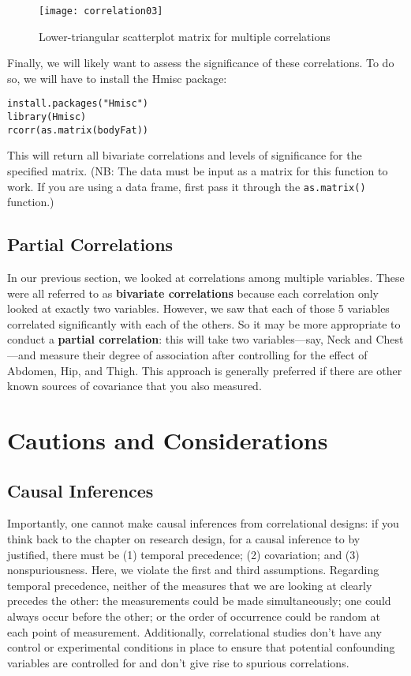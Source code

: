\begin{figure}[h]
\texttt{[image: correlation03]}
\label{fig:correlation03}
\caption{Lower-triangular scatterplot matrix for multiple correlations}
\end{figure}

Finally, we will likely want to assess the significance of these correlations. To do so, we will have to install the Hmisc package:

\begin{framed}
\begin{Verbatim}[samepage=TRUE]
install.packages("Hmisc")
library(Hmisc)
rcorr(as.matrix(bodyFat))
\end{Verbatim}
\end{framed}

This will return all bivariate correlations and levels of significance for the specified matrix. (NB: The data must be input as a matrix for this function to work. If you are using a data frame, first pass it through the \verb|as.matrix()| function.)

\subsection{Partial Correlations}
In our previous section, we looked at correlations among multiple variables. These were all referred to as \textbf{bivariate correlations} because each correlation only looked at exactly two variables. However, we saw that each of those 5 variables correlated significantly with each of the others. So it may be more appropriate to conduct a \textbf{partial correlation}: this will take two variables---say, Neck and Chest---and measure their degree of association after controlling for the effect of Abdomen, Hip, and Thigh. This approach is generally preferred if there are other known sources of covariance that you also measured.

\section{Cautions and Considerations}
\subsection{Causal Inferences}
Importantly, one cannot make causal inferences from correlational designs: if you think back to the chapter on research design, for a causal inference to by justified, there must be (1) temporal precedence; (2) covariation; and (3) nonspuriousness. Here, we violate the first and third assumptions. Regarding temporal precedence, neither of the measures that we are looking at clearly precedes the other: the measurements could be made simultaneously; one could always occur before the other; or the order of occurrence could be random at each point of measurement. Additionally, correlational studies don't have any control or experimental conditions in place to ensure that potential confounding variables are controlled for and don't give rise to spurious correlations.

